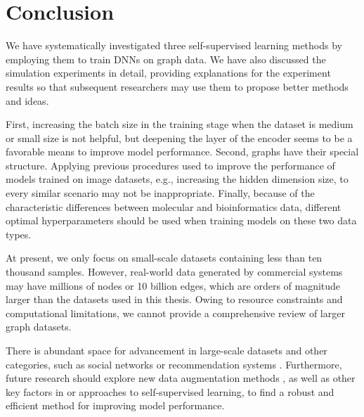 
\section{Conclusion}\label{sec:5}

We have systematically investigated three self-supervised learning methods by employing them to train DNNs on graph data. We have also discussed the simulation experiments in detail, providing explanations for the experiment results so that subsequent researchers may use them to propose better methods and ideas.

First, increasing the batch size in the training stage when the dataset is medium or small size is not helpful, but deepening the layer of the encoder seems to be a favorable means to improve model performance. Second, graphs have their special structure. Applying previous procedures used to improve the performance of models trained on image datasets, e.g., increasing the hidden dimension size, to every similar scenario may not be inappropriate. Finally, because of the characteristic differences between molecular and bioinformatics data, different optimal hyperparameters should be used when training models on these two data types.

At present, we only focus on small-scale datasets containing less than ten thousand samples. However, real-world data generated by commercial systems may have millions of nodes or 10 billion edges, which are orders of magnitude larger than the datasets used in this thesis. Owing to resource constraints and computational limitations, we cannot provide a comprehensive review of larger graph datasets. 


There is abundant space for advancement in large-scale datasets \cite{choi2022triangular} and other categories, such as social networks or recommendation systems \cite{mahcl}. Furthermore, future research should explore new data augmentation methods \cite{yang2022contrastive, shen2022improving}, as well as other key factors in or approaches \cite{hou2022graphmae} to self-supervised learning, to find a robust and efficient method for improving model performance.


